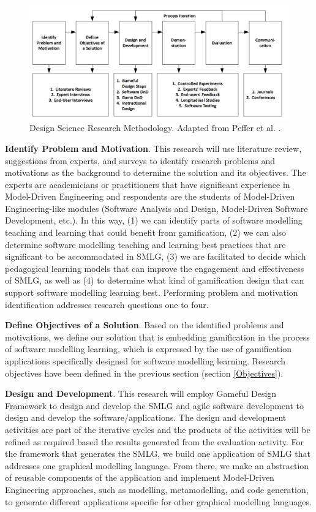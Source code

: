 \documentclass[12pt, a4paper]{report}
\begin{document}
\begin{figure}[ht] \centering \includegraphics[width=\textwidth]{dsrm}
\caption{Design Science Research Methodology. Adapted from Peffer et al. \cite{peffers2007design}.}
\label{dsrm}
\end{figure}

\textbf{Identify Problem and Motivation}. This research will use literature review, suggestions from experts, and surveys to identify research problems and motivations as the background to determine the solution and its objectives. The experts are academicians or practitioners that have significant experience in Model-Driven Engineering and respondents are the students of Model-Driven Engineering-like modules (Software Analysis and Design, Model-Driven Software Development, etc.). In this way, (1) we can identify parts of software modelling teaching and learning that could benefit from gamification, (2) we can also determine software modelling teaching and learning best practices that are significant to be accommodated in SMLG, (3) we are facilitated to decide which pedagogical learning models that can improve the engagement and effectiveness of SMLG, as well as (4) to determine what kind of gamification design that can support software modelling learning best. Performing problem and motivation identification addresses research questions one to four.  

\textbf{Define Objectives of a Solution}. Based on the identified problems and motivations, we define our solution that is embedding gamification in the process of software modelling learning, which is expressed by the use of gamification applications specifically designed for software modelling learning. Research objectives have been defined in the previous section (section \ref{Objectives}).

\textbf{Design and Development}. This research will employ Gameful Design
Framework \cite{deterding2015lens} to design and develop the SMLG and agile
software development \cite{stober2010overview} to design and develop the
software/applications. The design and development activities are part of the
iterative cycles and the products of the activities will be refined as required
based the results generated from the evaluation activity. For the framework that
generates the SMLG, we build one application of SMLG that addresses one
graphical modelling language. From there, we make an abstraction of reusable
components of the application and implement Model-Driven Engineering approaches,
such as modelling, metamodelling, and code generation, to generate different
applications specific for other graphical modelling languages.
\end{document}

